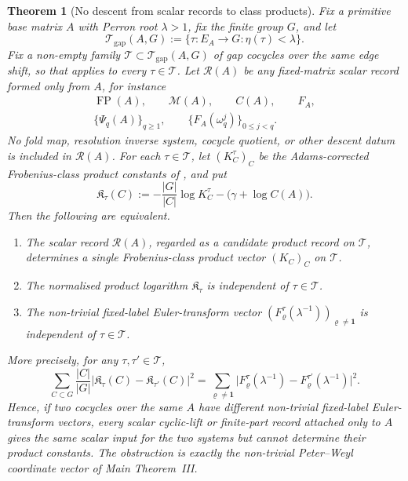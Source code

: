 \documentclass[11pt,a4paper]{amsart}
\theoremstyle{plain}
\newtheorem{theorem}{Theorem}[section]
\theoremstyle{definition}
\theoremstyle{remark}
\DeclareMathOperator{\FP}{FP}
\newcommand{\abs}[1]{\lvert #1 \rvert}
\begin{document}
\begin{theorem}[No descent from scalar records to class products]
  \label{thm:scalar-class-product-no-descent}
  Fix a primitive base matrix \(A\) with Perron root \(\lambda>1\), fix the
  finite group \(G\), and let
  \[
    \mathcal T_{\mathrm{gap}}(A,G)
    :=\{\tau:E_A\to G:\eta(\tau)<\lambda\}.
  \]
  Fix a non-empty family
  \(\mathscr T\subset\mathcal T_{\mathrm{gap}}(A,G)\) of gap cocycles over
  the same edge shift, so that 
  applies to every \(\tau\in\mathscr T\).  Let \(\mathcal R(A)\) be any
  fixed-matrix scalar
  record formed only from \(A\), for instance
  \[
    \begin{gathered}
      \FP(A),\qquad \mathcal M(A),\qquad C(A),\qquad F_A,\\
      \{\Psi_q(A)\}_{q\ge1},
      \qquad \{F_A(\omega_q^j)\}_{0\le j<q}.
    \end{gathered}
  \]
  No fold map, resolution inverse system, cocycle quotient, or other descent
  datum is included in \(\mathcal R(A)\).  For each
  \(\tau\in\mathscr T\), let \((K_C^\tau)_C\) be the
  Adams-corrected Frobenius-class product constants of
  , and put
  \[
    \mathfrak K_\tau(C):=
    -\frac{|G|}{|C|}\log K_C^\tau-\bigl(\gamma+\log C(A)\bigr).
  \]
  Then the following are equivalent.
  \begin{enumerate}[label=\textup{(\roman*)},leftmargin=*]
    \item The scalar record \(\mathcal R(A)\), regarded as a candidate
      product record on \(\mathscr T\), determines a single
      Frobenius-class product vector \((K_C)_C\) on \(\mathscr T\).
    \item The normalised product logarithm
      \(\mathfrak K_\tau\) is independent of
      \(\tau\in\mathscr T\).
    \item The non-trivial fixed-label Euler-transform vector
      \((F_\varrho^\tau(\lambda^{-1}))_{\varrho\ne\mathbf1}\) is
      independent of \(\tau\in\mathscr T\).
  \end{enumerate}
  More precisely, for any \(\tau,\tau'\in\mathscr T\),
  \begin{equation}\label{eq:scalar-product-no-descent-distance}
    \sum_{C\subset G}\frac{|C|}{|G|}
      \abs{\mathfrak K_\tau(C)-\mathfrak K_{\tau'}(C)}^2
    =
    \sum_{\varrho\ne\mathbf1}
      \abs{F_\varrho^\tau(\lambda^{-1})
            -F_\varrho^{\tau'}(\lambda^{-1})}^2 .
  \end{equation}
  Hence, if two cocycles over the same \(A\) have different non-trivial
  fixed-label Euler-transform vectors, every scalar cyclic-lift or finite-part
  record attached only to \(A\) gives the same scalar input for the two systems
  but cannot determine their product constants.  The obstruction is exactly
  the non-trivial Peter--Weyl coordinate vector of Main Theorem~III.
\end{theorem}
\end{document}
